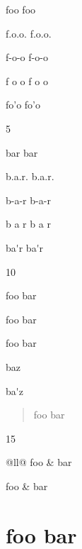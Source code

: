 
\def\mytitle{Abbreviations}


\gls{foo} \gls{foo}

\gls{f.o.o.} \gls{f.o.o.}

f-o-o f-o-o

\gls{f o o} \gls{f o o}

fo'o fo'o

5

\gls{bar} \gls{bar}

\gls{b.a.r.} \gls{b.a.r.}

\gls{b-a-r} \gls{b-a-r}

\gls{b a r} \gls{b a r}

\gls{ba'r} \gls{ba'r}

10

\gls{foo bar}

\gls{foo}
\gls{bar}

\gls{foo} \gls{bar}

\gls{baz}

\gls{ba'z}

\begin{quote}
\gls{foo bar}
\end{quote}

15

\begin{table}[htbp]
\begin{minipage}{\linewidth}
\setlength{\tymax}{0.5\linewidth}
\centering
\small
\caption{\gls{foo bar}}
\label{foobar}
\begin{tabulary}{\textwidth}{@{}ll@{}} \toprule
 \gls{foo} & \gls{bar} \\
\midrule

 \gls{foo} & \gls{bar} \\
\bottomrule

\end{tabulary}
\end{minipage}
\end{table}

\part{foo bar}
\label{foobar}

